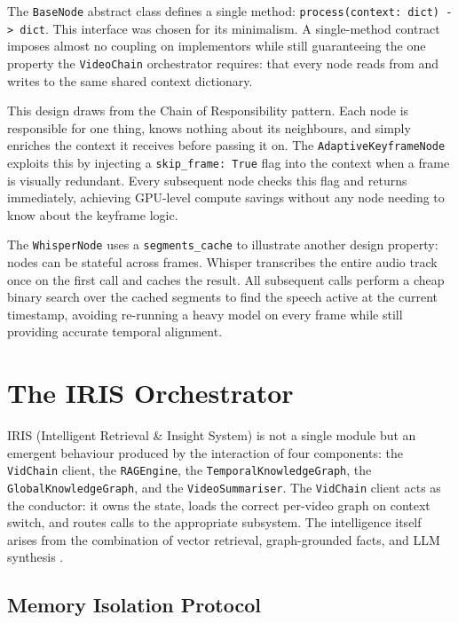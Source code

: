 The \texttt{BaseNode} abstract class defines a single method: \texttt{process(context: dict) -> dict}. This interface was chosen for its minimalism. A single-method contract imposes almost no coupling on implementors while still guaranteeing the one property the \texttt{VideoChain} orchestrator requires: that every node reads from and writes to the same shared context dictionary.

This design draws from the Chain of Responsibility pattern. Each node is responsible for one thing, knows nothing about its neighbours, and simply enriches the context it receives before passing it on. The \texttt{AdaptiveKeyframeNode} exploits this by injecting a \texttt{skip\_frame: True} flag into the context when a frame is visually redundant. Every subsequent node checks this flag and returns immediately, achieving GPU-level compute savings without any node needing to know about the keyframe logic.

The \texttt{WhisperNode} \cite{whisper} uses a \texttt{segments\_cache} to illustrate another design property: nodes can be stateful across frames. Whisper transcribes the entire audio track once on the first call and caches the result. All subsequent calls perform a cheap binary search over the cached segments to find the speech active at the current timestamp, avoiding re-running a heavy model on every frame while still providing accurate temporal alignment.

\section{The IRIS Orchestrator}

IRIS (Intelligent Retrieval \& Insight System) is not a single module but an emergent behaviour produced by the interaction of four components: the \texttt{VidChain} client, the \texttt{RAGEngine}, the \texttt{TemporalKnowledgeGraph}, the \texttt{GlobalKnowledgeGraph}, and the \texttt{VideoSummariser}. The \texttt{VidChain} client acts as the conductor: it owns the state, loads the correct per-video graph on context switch, and routes calls to the appropriate subsystem. The intelligence itself arises from the combination of vector retrieval, graph-grounded facts, and LLM synthesis \cite{ollama}.

\subsection{Memory Isolation Protocol}

